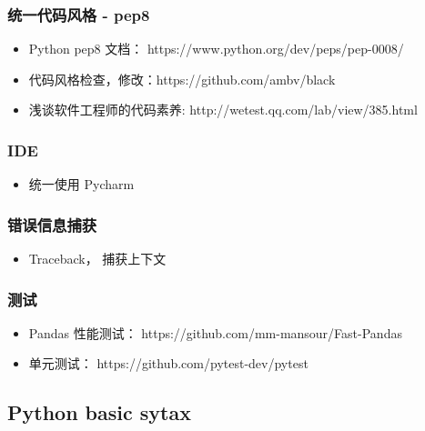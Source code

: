\documentclass[11pt]{article}
\providecommand{\tightlist}{%
      \setlength{\itemsep}{0pt}\setlength{\parskip}{0pt}}
\begin{document}
\subsubsection{统一代码风格 -
pep8}\label{ux7edfux4e00ux4ee3ux7801ux98ceux683c---pep8}

\begin{itemize}
\tightlist
\item
  Python pep8 文档： https://www.python.org/dev/peps/pep-0008/
\item
  代码风格检查，修改：https://github.com/ambv/black
\item
  浅谈软件工程师的代码素养: http://wetest.qq.com/lab/view/385.html
\end{itemize}

\subsubsection{IDE}\label{ide}

\begin{itemize}
\tightlist
\item
  统一使用 Pycharm
\end{itemize}

\subsubsection{错误信息捕获}\label{ux9519ux8befux4fe1ux606fux6355ux83b7}

\begin{itemize}
\tightlist
\item
  Traceback， 捕获上下文
\end{itemize}

\subsubsection{测试}\label{ux6d4bux8bd5}

\begin{itemize}
\tightlist
\item
  Pandas 性能测试： https://github.com/mm-mansour/Fast-Pandas
\item
  单元测试： https://github.com/pytest-dev/pytest
\end{itemize}

    \subsection{Python basic sytax}\label{python-basic-sytax}
\end{document}
